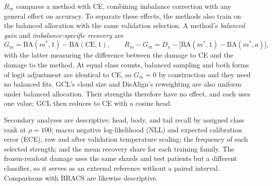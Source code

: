 \documentclass[11pt]{article}
\begin{document}
$R_m$ compares a method with CE, combining imbalance correction with any general effect on accuracy. To separate these effects, the methods also train on the balanced allocation with the same validation selection. A method's \emph{balanced gain} and \emph{imbalance-specific recovery} are
\begin{equation}
  G_m=\mathrm{BA}(m^{*},1)-\mathrm{BA}(\mathrm{CE},1),\qquad
  R_m-G_m=D_a-\bigl[\mathrm{BA}(m^{*},1)-\mathrm{BA}(m^{*},a)\bigr],
  \label{eq:specific}
\end{equation}
\noindent with the latter measuring the difference between the damage to CE and the damage to the method. At equal class counts, balanced sampling and both forms of logit adjustment are identical to CE, so $G_m=0$ by construction and they need no balanced fits. GCL's cloud size and DisAlign's reweighting are also uniform under balanced allocation. Their strengths therefore have no effect, and each uses one value; GCL then reduces to CE with a cosine head.

Secondary analyses are descriptive: head, body, and tail recall by assigned class rank at $\rho=100$; macro negative log-likelihood (NLL) and expected calibration error (ECE), raw and after validation temperature scaling; the frequency of each selected strength; and the mean recovery share for each training family. The frozen-readout damage \citep{queisler2026prevalenceTcga} uses the same shards and test patients but a different classifier, so it serves as an external reference without a paired interval. Comparisons with BRACS \citep{queisler2026mitigationBracs} are likewise descriptive.





\end{document}
